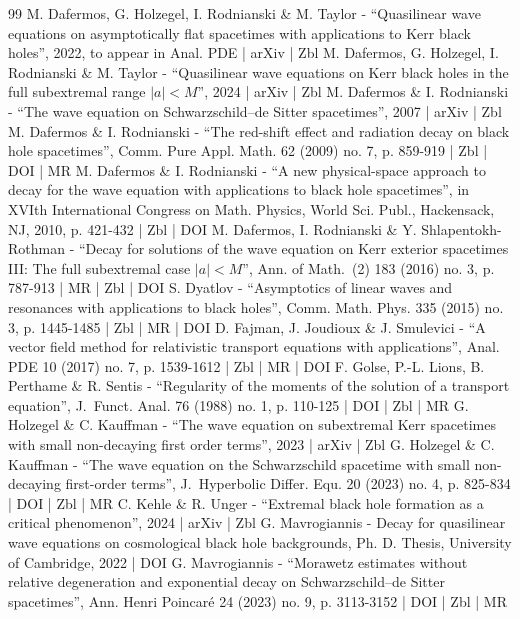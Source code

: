\begin{thebibliography}{99}
M. Dafermos, G. Holzegel, I. Rodnianski \& M. Taylor - “Quasilinear wave equations on asymptotically flat spacetimes with applications to Kerr black holes”, 2022, to appear in Anal. PDE | arXiv | Zbl
M. Dafermos, G. Holzegel, I. Rodnianski \& M. Taylor - “Quasilinear wave equations on Kerr black holes in the full subextremal range $|a|<{M}$”, 2024 | arXiv | Zbl
M. Dafermos \& I. Rodnianski - “The wave equation on Schwarzschild–de Sitter spacetimes”, 2007 | arXiv | Zbl
M. Dafermos \& I. Rodnianski - “The red-shift effect and radiation decay on black hole spacetimes”, Comm. Pure Appl. Math. 62 (2009) no. 7, p. 859-919 | Zbl | DOI | MR
M. Dafermos \& I. Rodnianski - “A new physical-space approach to decay for the wave equation with applications to black hole spacetimes”, in XVIth International Congress on Math. Physics, World Sci. Publ., Hackensack, NJ, 2010, p. 421-432 | Zbl | DOI
M. Dafermos, I. Rodnianski \& Y. Shlapentokh-Rothman - “Decay for solutions of the wave equation on Kerr exterior spacetimes III: The full subextremal case $|a|<M$”, Ann. of Math. (2) 183 (2016) no. 3, p. 787-913 | MR | Zbl | DOI
S. Dyatlov - “Asymptotics of linear waves and resonances with applications to black holes”, Comm. Math. Phys. 335 (2015) no. 3, p. 1445-1485 | Zbl | MR | DOI
D. Fajman, J. Joudioux \& J. Smulevici - “A vector field method for relativistic transport equations with applications”, Anal. PDE 10 (2017) no. 7, p. 1539-1612 | Zbl | MR | DOI
F. Golse, P.-L. Lions, B. Perthame \& R. Sentis - “Regularity of the moments of the solution of a transport equation”, J. Funct. Anal. 76 (1988) no. 1, p. 110-125 | DOI | Zbl | MR
G. Holzegel \& C. Kauffman - “The wave equation on subextremal Kerr spacetimes with small non-decaying first order terms”, 2023 | arXiv | Zbl
G. Holzegel \& C. Kauffman - “The wave equation on the Schwarzschild spacetime with small non-decaying first-order terms”, J. Hyperbolic Differ. Equ. 20 (2023) no. 4, p. 825-834 | DOI | Zbl | MR
C. Kehle \& R. Unger - “Extremal black hole formation as a critical phenomenon”, 2024 | arXiv | Zbl
G. Mavrogiannis - Decay for quasilinear wave equations on cosmological black hole backgrounds, Ph. D. Thesis, University of Cambridge, 2022 | DOI
G. Mavrogiannis - “Morawetz estimates without relative degeneration and exponential decay on Schwarzschild–de Sitter spacetimes”, Ann. Henri Poincaré 24 (2023) no. 9, p. 3113-3152 | DOI | Zbl | MR

\end{thebibliography}
